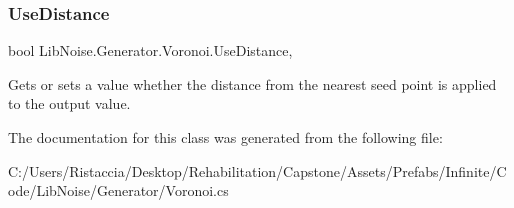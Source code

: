 \subsubsection{\texorpdfstring{Use\+Distance}{UseDistance}}
{\footnotesize\ttfamily bool Lib\+Noise.\+Generator.\+Voronoi.\+Use\+Distance\hspace{0.3cm}{\ttfamily [get]}, {\ttfamily [set]}}



Gets or sets a value whether the distance from the nearest seed point is applied to the output value. 



The documentation for this class was generated from the following file\+:\begin{DoxyCompactItemize}
\item 
C\+:/\+Users/\+Ristaccia/\+Desktop/\+Rehabilitation/\+Capstone/\+Assets/\+Prefabs/\+Infinite/\+Code/\+Lib\+Noise/\+Generator/Voronoi.\+cs\end{DoxyCompactItemize}
